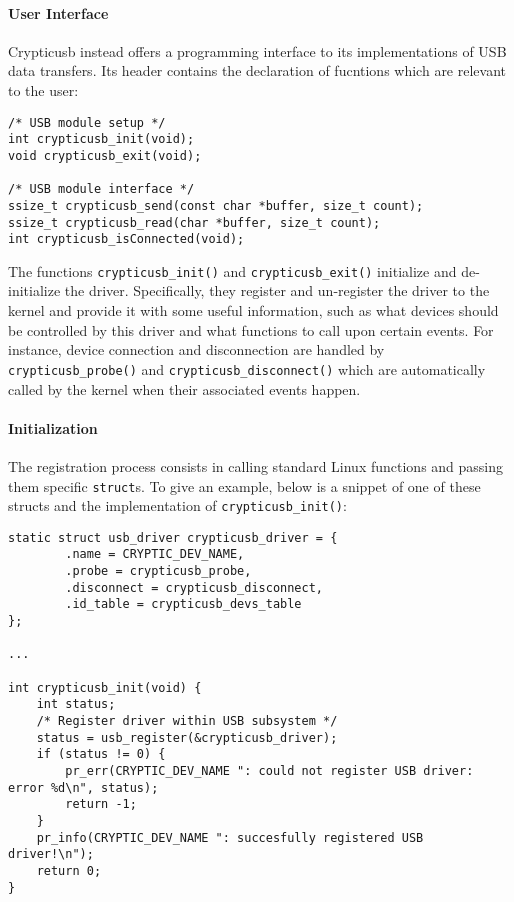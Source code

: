 \paragraph{User Interface} Crypticusb instead offers a programming interface to its implementations of USB data transfers. Its header contains the declaration of fucntions which are relevant to the user:
\begin{lstlisting}
/* USB module setup */
int crypticusb_init(void);
void crypticusb_exit(void);

/* USB module interface */
ssize_t crypticusb_send(const char *buffer, size_t count);
ssize_t crypticusb_read(char *buffer, size_t count);
int crypticusb_isConnected(void);
\end{lstlisting}
The functions \texttt{crypticusb\_init()} and \texttt{crypticusb\_exit()} initialize and de-initialize the driver. Specifically, they register and un-register the driver to the kernel and provide it with some useful information, such as what devices should be controlled by this driver and what functions to call upon certain events. For instance, device connection and disconnection are handled by \texttt{crypticusb\_probe()} and \texttt{crypticusb\_disconnect()} which are automatically called by the kernel when their associated events happen. \\

\paragraph{Initialization} The registration process consists in calling standard Linux functions and passing them specific \texttt{struct}s. To give an example, below is a snippet of one of these structs and the implementation of \texttt{crypticusb\_init()}:
\begin{lstlisting}
static struct usb_driver crypticusb_driver = {
        .name = CRYPTIC_DEV_NAME,
        .probe = crypticusb_probe,
        .disconnect = crypticusb_disconnect,
        .id_table = crypticusb_devs_table
};

...

int crypticusb_init(void) {
    int status;
    /* Register driver within USB subsystem */
    status = usb_register(&crypticusb_driver);
    if (status != 0) {
        pr_err(CRYPTIC_DEV_NAME ": could not register USB driver: error %d\n", status);
        return -1;
    }
    pr_info(CRYPTIC_DEV_NAME ": succesfully registered USB driver!\n");
    return 0;
}
\end{lstlisting}

